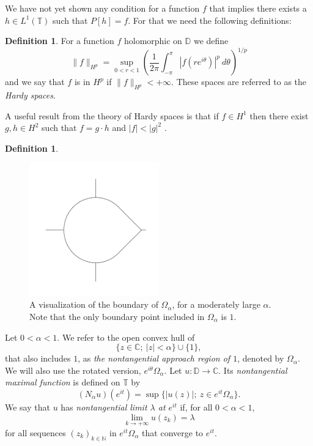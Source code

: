\documentclass[a4paper,12pt,twoside,BCOR=10mm]{scrbook}
\theoremstyle{definition}
\theoremstyle{definition}
\theoremstyle{definition}
\newtheorem{definition}[theorem]{Definition}
\begin{document}
We have not yet shown any condition for a function $f$ that implies there exists a $h \in L^1(\mathbb{T})$ such that $P[h] = f$.
For that we need the following definitions:
\begin{definition}
\label{index24}
For a function $f$ holomorphic on $\mathbb{D}$ we define
\[
	\|f\|_{H^p} = 
	\sup_{0 < r < 1} \left ( \frac{1}{2\pi}\int_{-\pi}^{\pi} |f(re^{i\theta})|^p\ d\theta \right )^{1/p}
\]
and we say that $f$ is in $H^p$ if $\|f\|_{H^p} < +\infty$.
These spaces are referred to as the \emph{Hardy spaces}.
\end{definition}
A useful result from the theory of Hardy spaces is that if $f \in H^1$ then there exist $g, h \in H^2$ such that $f = g \cdot h$ and $|f| < |g|^2$ \citep[Theorem $17.10$]{rudin2}.
\begin{definition}
\label{index25}
\begin{figure}[h]
\centering
\includegraphics[width=0.5\textwidth]{approach-region-7-boundary}
\caption{A visualization of the boundary of $\Omega_{\alpha}$, for a moderately large $\alpha$. Note that the only boundary point included in $\Omega_{\alpha}$ is $1$. }
\end{figure}
Let $0 < \alpha < 1$.
We refer to the open convex hull of
\[
	\{z \in \mathbb{C};\ |z| < \alpha\} \cup \{1\},
\]
that also includes $1$, as \emph{the nontangential approach region of $1$}, denoted by $\Omega_{\alpha}$.
We will also use the rotated version, $e^{i\theta}\Omega_{\alpha}$.
Let $u: \mathbb{D} \rightarrow \mathbb{C}$.
Its \emph{nontangential maximal function} is defined on $\mathbb{T}$ by
\[
	(N_{\alpha}u)(e^{it}) = \sup \{|u(z)|;\ z \in e^{it}\Omega_{\alpha}\}.
\]
We say that $u$ has \emph{nontangential limit $\lambda$ at $e^{it}$} if, for all $0 < \alpha < 1$,
\[
	\lim_{k \rightarrow +\infty} u(z_k) = \lambda
\]
for all sequences $(z_k)_{k \in \mathbb{N}}$ in $e^{it}\Omega_{\alpha}$ that converge to $e^{it}$.
\end{definition}
\end{document}
